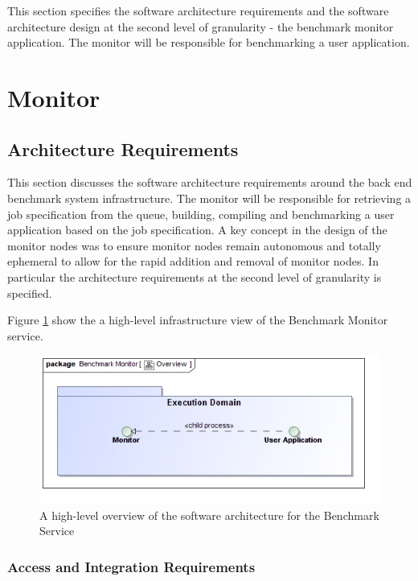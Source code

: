 This section specifies the software architecture requirements and the software
architecture design at the second level of granularity - the benchmark monitor
application. The monitor will be responsible for benchmarking a user application.

\section{Monitor}
\subsection{Architecture Requirements}
This section discusses the software architecture requirements around the
back end benchmark system infrastructure. The monitor will be responsible for
retrieving a job specification from the queue, building, compiling and
benchmarking a user application based on the job specification. A key concept
in the design of the monitor nodes was to ensure monitor nodes remain autonomous
and totally ephemeral to allow for the rapid addition and removal of monitor 
nodes. In particular the architecture requirements at the second level of
granularity is specified.

Figure \ref{fig:benchmarkInfrastructure} show the a high-level infrastructure
view of the Benchmark Monitor service.

\begin{figure}[H]
  \begin{center}
  \includegraphics[scale=0.4]{../Diagrams and Charts/Overview/BenchmarkInfrastructure.jpg}
  \caption{A high-level overview of the software architecture for the Benchmark Service}
  \label{fig:benchmarkInfrastructure}
  \end{center}
\end{figure}


\subsubsection{Access and Integration Requirements}
\label{sec:accessIntegrationRequirementsManagementSystem}
